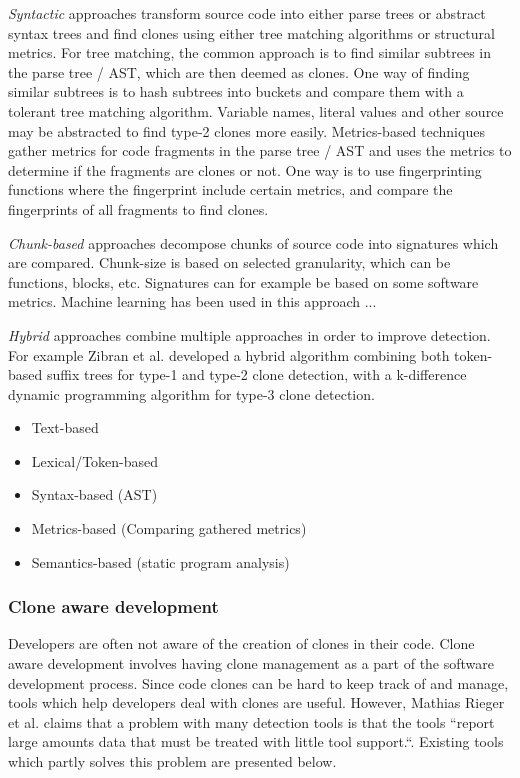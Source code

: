 \documentclass[12pt]{article}
\begin{document}
\textit{Syntactic} approaches transform source code into either parse trees or abstract
syntax trees and find clones using either tree matching algorithms or structural metrics.
For tree matching, the common approach is to find similar subtrees in the parse tree /
AST, which are then deemed as clones. One way of finding similar subtrees is to hash
subtrees into buckets and compare them with a tolerant tree matching algorithm. Variable
names, literal values and other source may be abstracted to find type-2 clones more
easily. Metrics-based techniques gather metrics for code fragments in the parse tree / AST
and uses the metrics to determine if the fragments are clones or not. One way is to use
fingerprinting functions where the fingerprint include certain metrics, and compare the
fingerprints of all fragments to find clones.

\textit{Chunk-based} approaches decompose chunks of source code into signatures which are
compared. Chunk-size is based on selected granularity, which can be functions, blocks,
etc. Signatures can for example be based on some software metrics. Machine learning has
been used in this approach ...

\textit{Hybrid} approaches combine multiple approaches in order to improve detection. For
example Zibran et al.\cite{Zibran_real_time_search} developed a hybrid algorithm
combining both token-based suffix trees for type-1 and type-2 clone detection, with
a k-difference dynamic programming algorithm for type-3 clone detection.


\begin{itemize}
    \item Text-based 
    \item Lexical/Token-based
    \item Syntax-based (AST)
    \item Metrics-based (Comparing gathered metrics)
    \item Semantics-based (static program analysis)
\end{itemize}

\subsubsection{Clone aware development}

Developers are often not aware of the creation of clones in their code. Clone aware
development involves having clone management as a part of the software development
process. Since code clones can be hard to keep track of and manage, tools which help
developers deal with clones are useful. However, Mathias Rieger et al. claims that
a problem with many detection tools is that the tools ``report large amounts data that must
be treated with little tool support.``\cite[1]{InsightsSystemWideDuplication}. Existing
tools which partly solves this problem are presented below.
\end{document}
